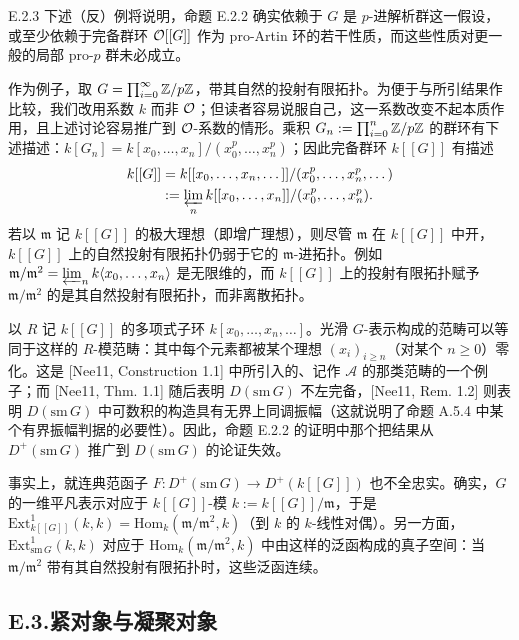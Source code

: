 \begin{exam}{E.2.3}\label{thm:a4-20-14}
下述（反）例将说明，命题 E.2.2 确实依赖于 $G$ 是 $p$-进解析群这一假设，或至少依赖于完备群环 $\mathcal{O}[[G]]$ 作为 pro-Artin 环的若干性质，而这些性质对更一般的局部 pro-$p$ 群未必成立。

作为例子，取 $G=\prod_{i=0}^\infty\mathbb{Z}/p\mathbb{Z}$，带其自然的投射有限拓扑。为便于与所引结果作比较，我们改用系数 $k$ 而非 $\mathcal{O}$；但读者容易说服自己，这一系数改变不起本质作用，且上述讨论容易推广到 $\mathcal{O}$-系数的情形。乘积 $G_n:=\prod_{i=0}^n\mathbb{Z}/p\mathbb{Z}$ 的群环有下述描述：$k[G_n]=k[x_0,\dots,x_n]/(x_0^p,\dots,x_n^p)$；因此完备群环 $k[[G]]$ 有描述
\[
\begin{aligned}
k[[G]]&=k[[x_0,\dots,x_n,\dots]]/(x_0^p,\dots,x_n^p,\dots)\\
&:=\varprojlim_n k[[x_0,\dots,x_n]]/(x_0^p,\dots,x_n^p).
\end{aligned}
\]
若以 $\mathfrak m$ 记 $k[[G]]$ 的极大理想（即增广理想），则尽管 $\mathfrak m$ 在 $k[[G]]$ 中开，$k[[G]]$ 上的自然投射有限拓扑仍弱于它的 $\mathfrak m$-进拓扑。例如 $\mathfrak m/\mathfrak m^2=\varprojlim_n k\langle x_0,\dots,x_n\rangle$ 是无限维的，而 $k[[G]]$ 上的投射有限拓扑赋予 $\mathfrak m/\mathfrak m^2$ 的是其自然投射有限拓扑，而非离散拓扑。

以 $R$ 记 $k[[G]]$ 的多项式子环 $k[x_0,\dots,x_n,\dots]$。光滑 $G$-表示构成的范畴可以等同于这样的 $R$-模范畴：其中每个元素都被某个理想 $(x_i)_{i\ge n}$（对某个 $n\ge0$）零化。这是 [Nee11, Construction 1.1] 中所引入的、记作 $\mathcal A$ 的那类范畴的一个例子；而 [Nee11, Thm. 1.1] 随后表明 $D(\mathrm{sm}\,G)$ 不左完备，[Nee11, Rem. 1.2] 则表明 $D(\mathrm{sm}\,G)$ 中可数积的构造具有无界上同调振幅（这就说明了命题 A.5.4 中某个有界振幅判据的必要性）。因此，命题 E.2.2 的证明中那个把结果从 $D^+(\mathrm{sm}\,G)$ 推广到 $D(\mathrm{sm}\,G)$ 的论证失效。
\end{exam}


事实上，就连典范函子 $F:D^+(\mathrm{sm}\,G)\to D^+(k[[G]])$ 也不全忠实。确实，$G$ 的一维平凡表示对应于 $k[[G]]$-模 $k:=k[[G]]/\mathfrak m$，于是 $\mathrm{Ext}^1_{k[[G]]}(k,k)=\mathrm{Hom}_k(\mathfrak m/\mathfrak m^2,k)$（到 $k$ 的 $k$-线性对偶）。另一方面，$\mathrm{Ext}^1_{\mathrm{sm}\,G}(k,k)$ 对应于 $\mathrm{Hom}_k(\mathfrak m/\mathfrak m^2,k)$ 中由这样的泛函构成的真子空间：当 $\mathfrak m/\mathfrak m^2$ 带有其自然投射有限拓扑时，这些泛函连续。

\subsection*{E.3.\quad 紧对象与凝聚对象}

